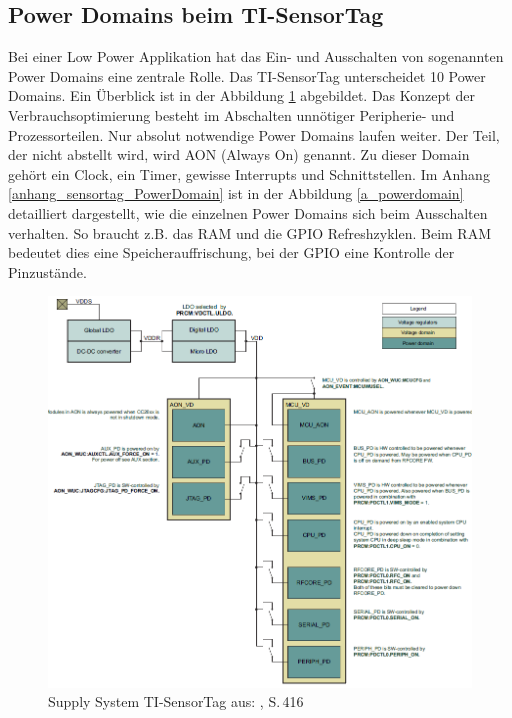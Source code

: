 \subsection{Power Domains beim TI-SensorTag}
\label{PowerDomains}

Bei einer Low Power Applikation hat das Ein- und Ausschalten von sogenannten Power Domains eine zentrale Rolle. Das TI-SensorTag unterscheidet 10 Power Domains. Ein Überblick  ist in der Abbildung  \ref{supply_syst} abgebildet. Das Konzept der Verbrauchsoptimierung besteht im Abschalten unnötiger Peripherie- und Prozessorteilen. Nur absolut notwendige Power Domains laufen weiter. Der Teil, der nicht abstellt wird, wird AON (Always On) genannt. Zu dieser Domain gehört ein Clock, ein Timer, gewisse Interrupts und Schnittstellen. Im Anhang \ref{anhang_sensortag_PowerDomain} ist in der Abbildung \ref{a_powerdomain} detailliert dargestellt, wie die einzelnen Power Domains sich beim Ausschalten verhalten. So braucht z.B. das RAM und die GPIO Refreshzyklen. Beim RAM bedeutet dies eine Speicherauffrischung, bei der GPIO eine Kontrolle der Pinzustände.

\clearpage
\begin{figure}[ht]
  \includegraphics[width=1.0\textwidth]{3Vorgehen/imag/powerdomain_1.png}
  \caption{Supply System TI-SensorTag aus: \cite{Sensortag_Manual}, S.\,416}
  \label{supply_syst}
\end{figure}


